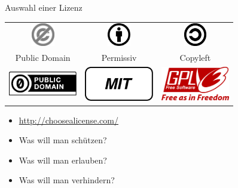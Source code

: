 \begin{frame}{Auswahl einer Lizenz}
	\begin{center}
		\begin{tabular}{ccc}
		\includegraphics[width=1cm]{res/PD-icon.pdf} & \includegraphics[width=1cm]{res/by.pdf} & \includegraphics[width=1cm]{res/copyleft.pdf} \\ 
		Public Domain & Permissiv & Copyleft \\
		\includegraphics[width=3cm]{res/cc-zero.pdf} & \includegraphics[width=3cm]{res/mit-logo.pdf} & \includegraphics[width=3cm]{res/gpl-v3-logo.pdf} \\
		\end{tabular} 
	\end{center}
	\begin{itemize}
		\item \url{http://choosealicense.com/}
	\end{itemize}
\end{frame}
\note
{
	\begin{itemize}
		\item Was will man schützen?
		\item Was will man erlauben?
		\item Was will man verhindern?
	\end{itemize}
}

